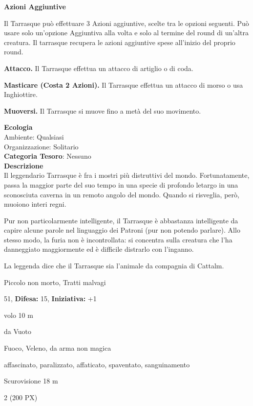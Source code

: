 \begin{multicols}{2}
{\textbf{Azioni Aggiuntive}

Il Tarrasque può effettuare 3 Azioni aggiuntive, scelte tra le opzioni seguenti. Può usare solo un'opzione Aggiuntiva alla volta e solo al termine del round di un'altra creatura. Il tarrasque recupera le azioni aggiuntive spese all'inizio del proprio round.

\textbf{Attacco.} Il Tarrasque effettua un attacco di artiglio o di coda.

\textbf{Masticare (Costa 2 Azioni).} Il Tarrasque effettua un attacco di morso o usa Inghiottire.

\textbf{Muoversi.} Il Tarrasque si muove fino a metà del suo movimento.

\textbf{Ecologia}\\
Ambiente: Qualsiasi\\
Organizzazione: Solitario\\
\textbf{Categoria Tesoro}: Nessuno\\
\textbf{Descrizione}\\
Il leggendario Tarrasque è fra i mostri più distruttivi del mondo. Fortunatamente, passa la maggior parte del suo tempo in una specie di profondo letargo in una sconosciuta caverna in un remoto angolo del mondo. Quando si risveglia, però, muoiono interi regni.

Pur non particolarmente intelligente, il Tarrasque è abbastanza intelligente da capire alcune parole nel linguaggio dei Patroni (pur non potendo parlare). Allo stesso modo, la furia non è incontrollata: si concentra sulla creatura che l'ha danneggiato maggiormente ed è difficile distrarlo con l'inganno.

La leggenda dice che il Tarrasque sia l'animale da compagnia di Cattalm.

\noindent
\begin{description}[noitemsep, topsep=0pt, parsep=0pt, partopsep=0pt, leftmargin=0cm, labelwidth=2.2cm]
	\item[\textbf{Taglia/Tipo:}] Piccolo non morto, Tratti malvagi
	\item[\textbf{Caratt.:}] 
	\item[\textbf{Punti Ferita:}] 51,  \textbf{Difesa:} 15,  \textbf{Iniziativa:} +1
	\item[\textbf{Movimento:}] volo 10 m
	\item[\textbf{Tiri Salvez.:}] 
	\item[\textbf{Res. Danni:}] da Vuoto
	\item[\textbf{Imm. Danni:}] Fuoco, Veleno, da arma non magica
	\item[\textbf{Immunità:}] affascinato, paralizzato, affaticato, spaventato, sanguinamento
	\item[\textbf{Sensi:}] Scurovisione 18 m
	\item[\textbf{Sfida:}] 2 (200 PX)\smallskip
\end{description}

}
\end{multicols}
